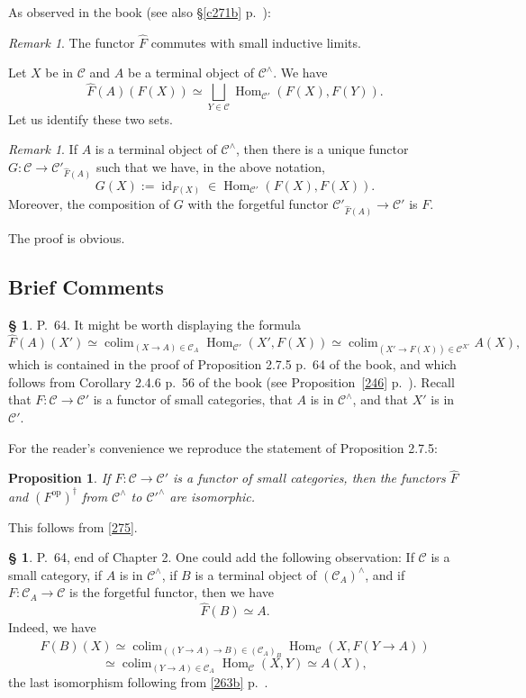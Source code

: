 \documentclass[12pt]{article}
\newtheorem{prop}[thm]{Proposition}
\theoremstyle{remark}
\newtheorem{rk}[thm]{Remark}
\theoremstyle{definition}
\newtheorem{s}[thm]{\S}
\newcommand{\C}{\mathcal C}
\DeclareMathOperator*{\colim}{colim}
\DeclareMathOperator{\id}{id}
\DeclareMathOperator{\Hom}{Hom}
\DeclareMathOperator{\op}{op}
\begin{document}
As observed in the book (see also \S\ref{c271b} p.~\pageref{c271b}):

\begin{rk}\label{272}
The functor $\widehat F$ commutes with small inductive limits.
\end{rk} 

Let $X$ be in $\C$ and $A$ be a terminal object of $\C^\wedge$. We have 
$$
\widehat F(A)(F(X))\simeq\bigsqcup_{Y\in\C}\Hom_{\C'}(F(X),F(Y)).
$$ 
Let us identify these two sets. 

\begin{rk}\label{272b}
If $A$ is a terminal object of $\C^\wedge$, then there is a unique functor $G:\C\to\C'_{\widehat F(A)}$ such that we have, in the above notation, 
$$
G(X):=\id_{F(X)}\in\Hom_{\C'}(F(X),F(X)).
$$ 
Moreover, the composition of $G$ with the forgetful functor $\C'_{\widehat F(A)}\to\C'$ is $F$.
\end{rk} 

The proof is obvious. 


\subsection{Brief Comments}

\begin{s} 
P.~64. It might be worth displaying the formula 
%
\begin{equation}\label{275}
\widehat F(A)(X')\simeq\colim_{(X\to A)\in\C_A}\Hom_{\C'}(X',F(X))\simeq
\colim_{(X'\to F(X))\in\C^{X'}}A(X),
\end{equation} 
%
which is contained in the proof of Proposition 2.7.5 p.~64 of the book, and which follows from Corollary 2.4.6 p.~56 of the book (see Proposition~\ref{246} p.~\pageref{246}). Recall that $F:\C\to\C'$ is a functor of small categories, that $A$ is in $\C^\wedge$, and that $X'$ is in $\C'$. 

For the reader's convenience we reproduce the statement of Proposition 2.7.5: 

\begin{prop}
If $F:\C\to\C'$ is a functor of small categories, then the functors $\widehat F$ and $(F^{\op})^\dagger$ from $\C^\wedge$ to $\C'^\wedge$ are isomorphic. 
\end{prop} 

This follows from \eqref{275}.
\end{s}

%

\begin{s}
P.~64, end of Chapter 2. One could add the following observation: If $\C$ is a small category, if $A$ is in $\C^\wedge$, if $B$ is a terminal object of $(\C_A)^\wedge$, and if $F:\C_A\to\C$ is the forgetful functor, then we have 
$$
\widehat F(B)\simeq A.
$$ 
Indeed, we have 
$$
\widehat F(B)(X)\simeq\colim_{((Y\to A)\to B)\in(\C_A)_B}\Hom_\C(X,F(Y\to A))
$$
$$
\simeq\colim_{(Y\to A)\in\C_A}\Hom_\C(X,Y)\simeq A(X),
$$ 
the last isomorphism following from \eqref{263b} p.~\pageref{263b}. 
\end{s}
\end{document}
